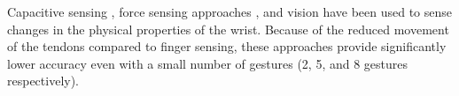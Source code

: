 \documentclass{sigchi}
\begin{document}

Capacitive sensing \cite{Rekimoto:2001:GGU:580581.856565}, force sensing approaches \cite{Dementyev:2014:WLG:2642918.2647396}, and vision \cite{Fukui:2011:HSC:2030112.2030154} have been used to sense changes in the physical properties of the wrist. Because of the reduced movement of the tendons compared to finger sensing, these approaches provide significantly lower accuracy even with a small number of gestures (2, 5, and 8 gestures respectively).




\end{document}

